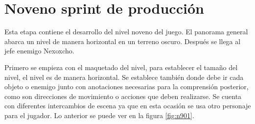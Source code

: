 
\section{Noveno sprint de producción}

Esta etapa contiene el desarrollo del nivel noveno del juego. El panorama general abarca un nivel de manera horizontal en un terreno oscuro. Después se llega al jefe enemigo Nexoxcho.

Primero se empieza con el maquetado del nivel, para establecer el tamaño del nivel, el nivel es de manera horizontal. Se establece también donde debe ir cada objeto o enemigo junto con anotaciones necesarias para la comprensión posterior, como son direcciones de movimiento o acciones que deben realizarse. Se cuenta con diferentes intercambios de escena ya que en esta ocasión se usa otro personaje para el jugador. Lo anterior se puede ver en la figura \ref{fig:n901}.
